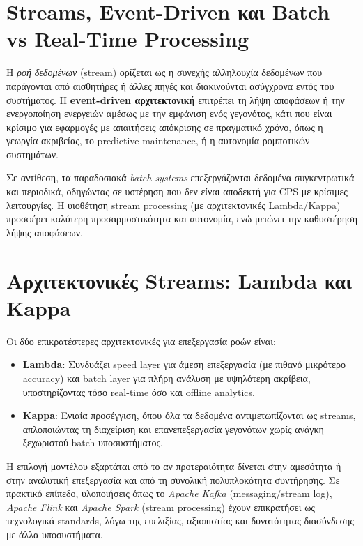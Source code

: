 \section{Streams, Event-Driven και Batch vs Real-Time Processing}

Η \textit{ροή δεδομένων} (stream) ορίζεται ως η συνεχής αλληλουχία δεδομένων που παράγονται από αισθητήρες ή άλλες πηγές και διακινούνται ασύγχρονα εντός του συστήματος. Η \textbf{event-driven αρχιτεκτονική} επιτρέπει τη λήψη αποφάσεων ή την ενεργοποίηση ενεργειών αμέσως με την εμφάνιση ενός γεγονότος, κάτι που είναι κρίσιμο για εφαρμογές με απαιτήσεις απόκρισης σε πραγματικό χρόνο, όπως η γεωργία ακριβείας, το predictive maintenance, ή η αυτονομία ρομποτικών συστημάτων.

Σε αντίθεση, τα παραδοσιακά \textit{batch systems} επεξεργάζονται δεδομένα συγκεντρωτικά και περιοδικά, οδηγώντας σε υστέρηση που δεν είναι αποδεκτή για CPS με κρίσιμες λειτουργίες. Η υιοθέτηση stream processing (με αρχιτεκτονικές Lambda/Kappa) προσφέρει καλύτερη προσαρμοστικότητα και αυτονομία, ενώ μειώνει την καθυστέρηση λήψης αποφάσεων.

\section{Αρχιτεκτονικές Streams: Lambda και Kappa}

Οι δύο επικρατέστερες αρχιτεκτονικές για επεξεργασία ροών είναι:

\begin{itemize}
	\item \textbf{Lambda}: Συνδυάζει speed layer για άμεση επεξεργασία (με πιθανό μικρότερο accuracy) και batch layer για πλήρη ανάλυση με υψηλότερη ακρίβεια, υποστηρίζοντας τόσο real-time όσο και offline analytics.
	\item \textbf{Kappa}: Ενιαία προσέγγιση, όπου όλα τα δεδομένα αντιμετωπίζονται ως streams, απλοποιώντας τη διαχείριση και επανεπεξεργασία γεγονότων χωρίς ανάγκη ξεχωριστού batch υποσυστήματος.
\end{itemize}

Η επιλογή μοντέλου εξαρτάται από το αν προτεραιότητα δίνεται στην αμεσότητα ή στην αναλυτική επεξεργασία και από τη συνολική πολυπλοκότητα συντήρησης. Σε πρακτικό επίπεδο, υλοποιήσεις όπως το \textit{Apache Kafka} (messaging/stream log), \textit{Apache Flink} και \textit{Apache Spark} (stream processing) έχουν επικρατήσει ως τεχνολογικά standards, λόγω της ευελιξίας, αξιοπιστίας και δυνατότητας διασύνδεσης με άλλα υποσυστήματα.

